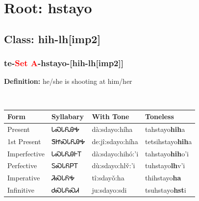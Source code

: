 \needspace{4in}
\section*{Root: hstayo}
\nopagebreak
{}
\needspace{3in}
\subsection*{Class: hih-lh[imp2]}
\nopagebreak
\needspace{2in}
\subsubsection*{te{-}\textcolor{Red}{Set A}{-}\textbf{hstayo}{-}[hih-lh[imp2]]}
\nopagebreak
\textbf{Definition: } he/she is shooting at him/her
\\[0.5em]
\begin{tabularx}{\textwidth}{l X X X}%
\toprule%
\textbf{Form}&\textbf{Syllabary}&\textbf{With Tone}&\textbf{Toneless}\\%
\midrule%
Present&ᏓᏍᏓᏲᎯᎭ&dà:sdayo:híha&tahstayo\textbf{hih}a\\%
1st Present&ᏕᏥᏍᏓᏲᎯᎭ&de:jî:sdayo:híha&tetsihstayo\textbf{hih}a\\%
Imperfective&ᏓᏍᏓᏲᎯᎰᎢ&dà:sdayo:hihó:’i&tahstayo\textbf{hih}o'i\\%
Perfective&ᏚᏍᏓᏲᏢᎢ&dù:sdayo:hlv̌:’i&tuhstayo\textbf{lh}v'i\\%
Imperative&ᏘᏍᏓᏲᎭ&tî:sdayǒ:ha&thihstayo\textbf{ha}\\%
Infinitive&ᏧᏍᏓᏲᏍᏗ&ju:sdayo:sdi&tsuhstayo\textbf{hst}i\\%
\bottomrule%
\end{tabularx}
\\[1em]